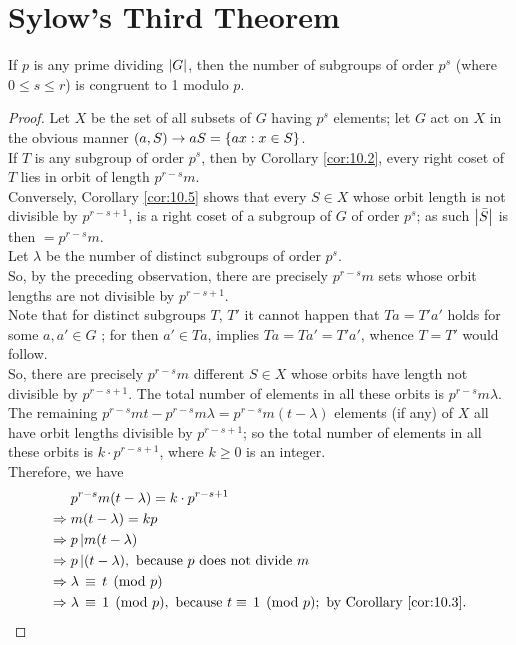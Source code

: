 \documentclass[../main-sheet.tex]{subfiles}
\begin{document}
\section{Sylow's Third Theorem}
\begin{thm}
    If \(p\) is any prime dividing \(\left\vert G\right\vert\), then the number of subgroups of order \(p^s\)
(where \(0 \leq s \leq r \)) is congruent to 1 modulo \(p\).
\end{thm}
\begin{proof}
    Let \(X\) be the set of all subsets of \(G\) having \(p^s\) elements; let \(G\) act on \(X\) in the
    obvious manner \((a,S) \to aS = \left\{ax: x \in S\right\}\).\\
    If \(T\) is any subgroup of order \(p^s\), then by Corollary \ref{cor:10.2}, every right coset of \(T\) lies in
    orbit of length \(p^{r-s}m\).\\
    Conversely, Corollary \ref{cor:10.5} shows that every \(S\in X\) whose orbit length is not divisible
    by \(p^{r-s+1}\), is a right coset of a subgroup of \(G\) of order \(p^s \); as such \(\left\vert\bar{S}\right\vert\) is then \( = p^{r-s}m\).\\
    Let \(\lambda\) be the number of distinct subgroups of order \(p^s\).\\

    So, by the preceding observation, there are precisely \(p^{r-s}m\) sets whose orbit lengths
    are not divisible by \(p^{r-s+1}\).\\

    Note that for distinct subgroups \(T \), \(T'\) it cannot happen that \(Ta = T'a'\) holds for some
    \(a,a' \in G\) ; for then \(a' \in Ta\), implies \(Ta = Ta' = T' a' \), whence \(T = T'\) would follow.\\


    \noindent So, there are precisely \(p^{r-s}m\) different \(S\in X\) whose orbits have length not divisible
    by \(p^{r-s+1}\). The total number of elements in all these orbits is \(p^{r-s}m\lambda\).\\

    The remaining \(p^{r-s}mt-p^{r-s}m\lambda=p^{r-s}m(t-\lambda)\) elements (if any) of \(X\) all have orbit lengths divisible by \(p^{r-s+1}\); so the total number of elements in all these orbits is \(k\cdot p^{r-s+1}\), where \(k\geq 0\) is an integer.\\


    Therefore, we have
    \begin{align*}
        &p^{r-s} m( t -\lambda) = k\cdot p^{r-s+1}\\
        \Rightarrow\;& m(t - \lambda) = kp\\
        \Rightarrow\;& p\,|  m(t - \lambda)\\
        \Rightarrow\;& p \,| (t - \lambda), \text{ because \(p\) does not divide } m\\ 
        \Rightarrow\;& \lambda \,\equiv\, t \pmod{p}\\
        \Rightarrow\;& \lambda \,\equiv \,1 \pmod{p}, \text{ because } t\equiv\, 1 \pmod{p}; \text{ by Corollary \ref{cor:10.3}}.
    \end{align*}
\end{proof}
\end{document}
